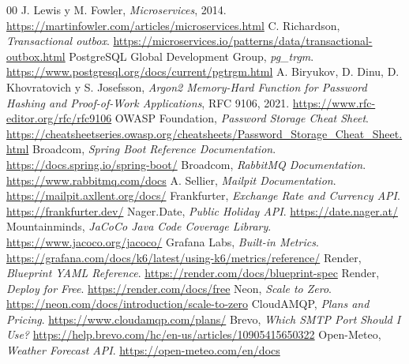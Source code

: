 \documentclass[conference]{IEEEtran}
\begin{document}
\clearpage
\GaleriaCobertura
\GaleriaRutas
\GaleriaDiagnostico
\GaleriaPicos

\begin{thebibliography}{00}
 J. Lewis y M. Fowler, \emph{Microservices}, 2014. \url{https://martinfowler.com/articles/microservices.html}
 C. Richardson, \emph{Transactional outbox}. \url{https://microservices.io/patterns/data/transactional-outbox.html}
 PostgreSQL Global Development Group, \emph{pg\_trgm}. \url{https://www.postgresql.org/docs/current/pgtrgm.html}
 A. Biryukov, D. Dinu, D. Khovratovich y S. Josefsson, \emph{Argon2 Memory-Hard Function for Password Hashing and Proof-of-Work Applications}, RFC 9106, 2021. \url{https://www.rfc-editor.org/rfc/rfc9106}
 OWASP Foundation, \emph{Password Storage Cheat Sheet}. \url{https://cheatsheetseries.owasp.org/cheatsheets/Password_Storage_Cheat_Sheet.html}
 Broadcom, \emph{Spring Boot Reference Documentation}. \url{https://docs.spring.io/spring-boot/}
 Broadcom, \emph{RabbitMQ Documentation}. \url{https://www.rabbitmq.com/docs}
 A. Sellier, \emph{Mailpit Documentation}. \url{https://mailpit.axllent.org/docs/}
 Frankfurter, \emph{Exchange Rate and Currency API}. \url{https://frankfurter.dev/}
 Nager.Date, \emph{Public Holiday API}. \url{https://date.nager.at/}
 Mountainminds, \emph{JaCoCo Java Code Coverage Library}. \url{https://www.jacoco.org/jacoco/}
 Grafana Labs, \emph{Built-in Metrics}. \url{https://grafana.com/docs/k6/latest/using-k6/metrics/reference/}
 Render, \emph{Blueprint YAML Reference}. \url{https://render.com/docs/blueprint-spec}
 Render, \emph{Deploy for Free}. \url{https://render.com/docs/free}
 Neon, \emph{Scale to Zero}. \url{https://neon.com/docs/introduction/scale-to-zero}
 CloudAMQP, \emph{Plans and Pricing}. \url{https://www.cloudamqp.com/plans/}
 Brevo, \emph{Which SMTP Port Should I Use?} \url{https://help.brevo.com/hc/en-us/articles/10905415650322}
 Open-Meteo, \emph{Weather Forecast API}. \url{https://open-meteo.com/en/docs}
\end{thebibliography}
\end{document}
